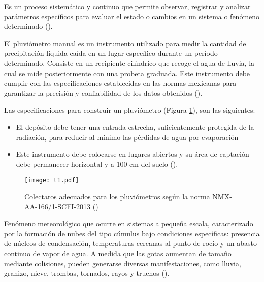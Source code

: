 \begin{definition}[Monitoreo]
Es un proceso sistemático y continuo que permite observar, registrar y analizar parámetros específicos para evaluar el estado o cambios en un sistema o fenómeno determinado (\cite{ciga_monitoreo}).
\end{definition}

\begin{definition}
El pluviómetro manual es un instrumento utilizado para medir la cantidad de precipitación líquida caída en un lugar específico durante un período determinado. Consiste en un recipiente cilíndrico que recoge el agua de lluvia, la cual se mide posteriormente con una probeta graduada. Este instrumento debe cumplir con las especificaciones establecidas en las normas mexicanas para garantizar la precisión y confiabilidad de los datos obtenidos (\cite{semarnat_pluviometro}).
\end{definition}

Las especificaciones para construir un pluviómetro (Figura \ref{t1}), son las siguientes:
\begin{itemize}
    \item El depósito debe tener una entrada estrecha, suficientemente protegida de la radiación, para reducir al mínimo las pérdidas de agua por evaporación
    \item Este instrumento debe colocarse en lugares abiertos y su área de captación debe permanecer horizontal y a 100 cm del suelo (\cite{se2013}). 
\end{itemize}

\begin{figure}[h!]
\centering
  \texttt{[image: t1.pdf]}
  \caption{Colectaros adecuados para los pluviómetros según la norma NMX-AA-166/1-SCFI-2013 (\cite{se2013})}
  \label{t1}
\end{figure}

\begin{definition}[Precipitación]
Fenómeno meteorológico que ocurre en sistemas a pequeña escala, caracterizado por la formación de nubes del tipo cúmulus bajo condiciones específicas: presencia de núcleos de condensación, temperaturas cercanas al punto de rocío y un abasto continuo de vapor de agua. A medida que las gotas aumentan de tamaño mediante colisiones, pueden generarse diversas manifestaciones, como lluvia, granizo, nieve, trombas, tornados, rayos y truenos  (\cite{ahrens2020}).
\end{definition}

